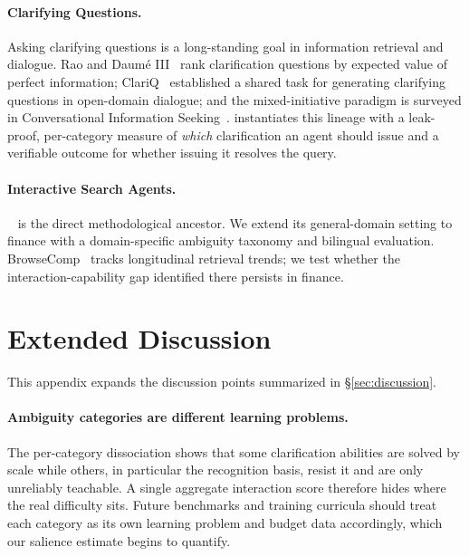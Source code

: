 \paragraph{Clarifying Questions.}
Asking clarifying questions is a long-standing goal in information retrieval and
dialogue. Rao and Daum\'e III~\citep{rao2018clarification} rank clarification
questions by expected value of perfect information; ClariQ~\citep{aliannejadi2020clariq}
established a shared task for generating clarifying questions in open-domain dialogue;
and the mixed-initiative paradigm is surveyed in Conversational Information
Seeking~\citep{zamani2023cis}. \fininteract instantiates this lineage with a
leak-proof, per-category measure of \emph{which} clarification an agent should issue and a
verifiable outcome for whether issuing it resolves the query.

\paragraph{Interactive Search Agents.}
\interactcomp~\citep{interactcomp2026} is the direct methodological ancestor.
We extend its general-domain setting to finance with a domain-specific
ambiguity taxonomy and bilingual evaluation.
BrowseComp~\citep{wei2025browsecomp} tracks longitudinal retrieval trends;
we test whether the interaction-capability gap identified there persists in
finance.



\section{Extended Discussion}
\label{app:discussion}

This appendix expands the discussion points summarized in \S\ref{sec:discussion}.

\paragraph{Ambiguity categories are different learning problems.} The per-category dissociation shows that some
clarification abilities are solved by scale while others, in particular the recognition basis, resist
it and are only unreliably teachable. A single aggregate interaction score therefore hides
where the real difficulty sits. Future benchmarks and training curricula should treat each
category as its own learning problem and budget data accordingly, which our salience estimate
begins to quantify.

